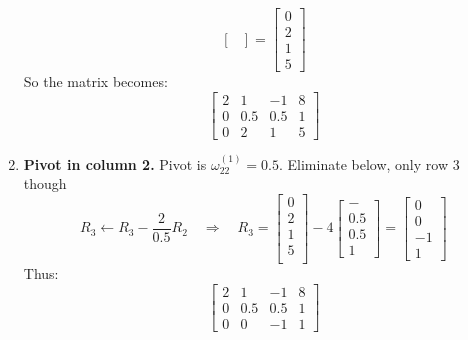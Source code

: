 \documentclass[../../../main.tex]{subfiles}
\begin{document}
\begin{enumerate}
\begin{equation*}
\begin{bmatrix}
              \end{bmatrix}
              =
              \begin{bmatrix}
                  0 \\ 2 \\ 1 \\ 5
              \end{bmatrix}
          \end{equation*}
          So the matrix becomes:
          \begin{equation*}
              \begin{bmatrix}
                  2 & 1   & -1  & 8 \\
                  0 & 0.5 & 0.5 & 1 \\
                  0 & 2   & 1   & 5
              \end{bmatrix}
          \end{equation*}
    \item \textbf{Pivot in column 2.}
          Pivot is $\omega_{22}^{(1)} = 0.5$.
          Eliminate below, only row 3 though
          \begin{equation*}
              R_3 \leftarrow R_3 - \frac{2}{0.5} R_2 \quad \Rightarrow \quad
              R_3=
              \begin{bmatrix}
                  0 \\2\\1\\5\\
              \end{bmatrix}
              -4
              \begin{bmatrix}
                  - \\0.5\\0.5\\1
              \end{bmatrix}
              =
              \begin{bmatrix}
                  0 \\0\\-1\\1
              \end{bmatrix}
          \end{equation*}
          Thus:
          \begin{equation*}
              \begin{bmatrix}
                  2 & 1   & -1  & 8 \\
                  0 & 0.5 & 0.5 & 1 \\
                  0 & 0   & -1  & 1
              \end{bmatrix}
          \end{equation*}


\end{enumerate}
\end{document}

